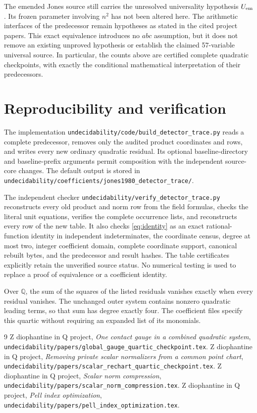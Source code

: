 \documentclass[11pt]{article}
\newcommand{\Q}{\mathbb Q}
\begin{document}
The emended Jones source still carries the unresolved universality
hypothesis \(U_{\rm em}\). Its frozen parameter involving \(n^2\)
has not been altered here. The arithmetic interfaces of the
predecessor remain hypotheses as stated in the cited project papers.
This exact equivalence introduces no \(abc\) assumption, but it
does not remove an existing unproved hypothesis or establish the
claimed 57-variable universal source. In particular, the counts
above are certified complete quadratic checkpoints, with exactly
the conditional mathematical interpretation of their predecessors.

\section{Reproducibility and verification}

The implementation
\nolinkurl{undecidability/code/build_detector_trace.py}
reads a complete predecessor, removes only the audited product
coordinates and rows, and writes every new ordinary quadratic
residual. Its optional baseline-directory and baseline-prefix
arguments permit composition with the independent source-core
changes. The default output is stored in
\nolinkurl{undecidability/coefficients/jones1980_detector_trace/}.

The independent checker
\nolinkurl{undecidability/verify_detector_trace.py}
reconstructs every old product and norm row from the field formulas,
checks the literal unit equations, verifies the complete occurrence
lists, and reconstructs every row of the new table. It also checks
\eqref{eq:identity} as an exact rational-function identity in
independent indeterminates, the coordinate census, degree at most
two, integer coefficient domain, complete coordinate support,
canonical rebuilt bytes, and the predecessor and result hashes.
The table certificates explicitly retain the unverified source
status. No numerical testing is used to replace a proof of
equivalence or a coefficient identity.

Over \(\Q\), the sum of the squares of the listed residuals
vanishes exactly when every residual vanishes. The unchanged outer
system contains nonzero quadratic leading terms, so that sum has
degree exactly four. The coefficient files specify this quartic
without requiring an expanded list of its monomials.

\begin{thebibliography}{9}
 Z diophantine in Q project,
\emph{One contact gauge in a combined quadratic system},
\nolinkurl{undecidability/papers/global_gauge_quartic_checkpoint.tex}.
 Z diophantine in Q project,
\emph{Removing private scalar normalizers from a common point chart},
\nolinkurl{undecidability/papers/scalar_rechart_quartic_checkpoint.tex}.
 Z diophantine in Q project,
\emph{Scalar norm compression},
\nolinkurl{undecidability/papers/scalar_norm_compression.tex}.
 Z diophantine in Q project,
\emph{Pell index optimization},
\nolinkurl{undecidability/papers/pell_index_optimization.tex}.
\end{thebibliography}
\end{document}
